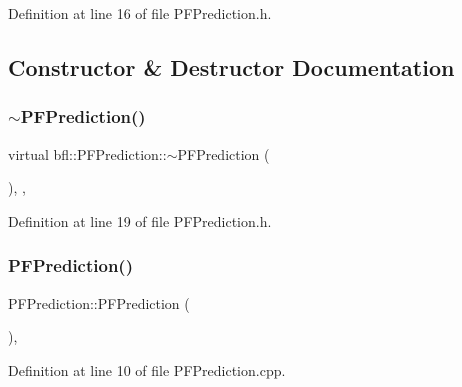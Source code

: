 Definition at line 16 of file P\+F\+Prediction.\+h.



\subsection{Constructor \& Destructor Documentation}
\mbox{\label{classbfl_1_1PFPrediction_a2183ecd8522d4a3f780c93256d10ecf8}} 
\subsubsection{\texorpdfstring{$\sim$\+P\+F\+Prediction()}{~PFPrediction()}}
{\footnotesize\ttfamily virtual bfl\+::\+P\+F\+Prediction\+::$\sim$\+P\+F\+Prediction (\begin{DoxyParamCaption}{ }\end{DoxyParamCaption})\hspace{0.3cm}{\ttfamily [inline]}, {\ttfamily [virtual]}, {\ttfamily [noexcept]}}



Definition at line 19 of file P\+F\+Prediction.\+h.

\mbox{\label{classbfl_1_1PFPrediction_a27c90e025bf5376cedd5dfc9657fb1b9}} 
\subsubsection{\texorpdfstring{P\+F\+Prediction()}{PFPrediction()}\hspace{0.1cm}{\footnotesize\ttfamily [1/2]}}
{\footnotesize\ttfamily P\+F\+Prediction\+::\+P\+F\+Prediction (\begin{DoxyParamCaption}{ }\end{DoxyParamCaption})\hspace{0.3cm}{\ttfamily [protected]}, {\ttfamily [noexcept]}}



Definition at line 10 of file P\+F\+Prediction.\+cpp.

